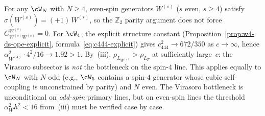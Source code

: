 \begin{remark}
\label{rem:even-spin-bottleneck}
For any $\cW_N$ with $N \geq 4$, even-spin generators
$W^{(s)}$ ($s$ even, $s \geq 4$) satisfy
$\sigma(W^{(s)}) = (+1)\,W^{(s)}$, so the
$\mathbb{Z}_2$ parity argument does not force
$C^{W^{(s)}}_{W^{(s)}W^{(s)}} = 0$.
For $\cW_4$, the explicit structure constant
(Proposition~\textup{\ref{prop:w4-ds-ope-explicit}},
formula~\eqref{eq:c444-explicit})
gives $c_{444}^2 \to 672/350$ as $c \to \infty$,
hence $\alpha_{W^{(4)}}^2 \cdot 4^2/16 \to 1.92 > 1$.
By~(iii), $\rho_{L_{W^{(4)}}} > \rho_{L_T}$
at sufficiently large~$c$: the Virasoro
subsector is \emph{not} the bottleneck on the
spin-$4$ line.
This applies equally to $\cW_N$ with $N$ odd
(e.g., $\cW_5$ contains a spin-$4$ generator whose
cubic self-coupling is unconstrained by parity)
and $N$ even.
The Virasoro bottleneck is unconditional on
\emph{odd-spin} primary lines, but on
even-spin lines the threshold
$\alpha_W^2 h^2 < 16$ from~(iii)
must be verified case by case.
\end{remark}

